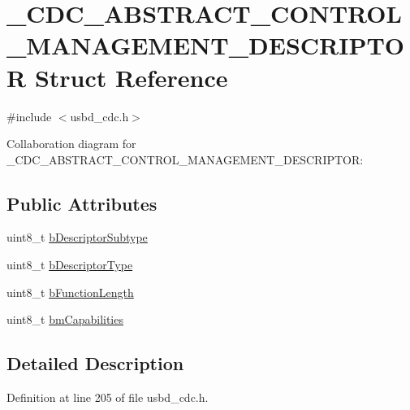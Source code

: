 \hypertarget{struct__CDC__ABSTRACT__CONTROL__MANAGEMENT__DESCRIPTOR}{}\section{\+\_\+\+C\+D\+C\+\_\+\+A\+B\+S\+T\+R\+A\+C\+T\+\_\+\+C\+O\+N\+T\+R\+O\+L\+\_\+\+M\+A\+N\+A\+G\+E\+M\+E\+N\+T\+\_\+\+D\+E\+S\+C\+R\+I\+P\+T\+OR Struct Reference}
\label{struct__CDC__ABSTRACT__CONTROL__MANAGEMENT__DESCRIPTOR}


{\ttfamily \#include $<$usbd\+\_\+cdc.\+h$>$}



Collaboration diagram for \+\_\+\+C\+D\+C\+\_\+\+A\+B\+S\+T\+R\+A\+C\+T\+\_\+\+C\+O\+N\+T\+R\+O\+L\+\_\+\+M\+A\+N\+A\+G\+E\+M\+E\+N\+T\+\_\+\+D\+E\+S\+C\+R\+I\+P\+T\+OR\+:
\subsection*{Public Attributes}
\begin{DoxyCompactItemize}
\item 
uint8\+\_\+t \hyperlink{struct__CDC__ABSTRACT__CONTROL__MANAGEMENT__DESCRIPTOR_a102b3c47bb589d906fa0ba2f383a8306}{b\+Descriptor\+Subtype}
\item 
uint8\+\_\+t \hyperlink{struct__CDC__ABSTRACT__CONTROL__MANAGEMENT__DESCRIPTOR_a5a7671be987b15ea0a360d4d0ba8981c}{b\+Descriptor\+Type}
\item 
uint8\+\_\+t \hyperlink{struct__CDC__ABSTRACT__CONTROL__MANAGEMENT__DESCRIPTOR_a97e809e9fd90d0da48f3fc083e6ffc01}{b\+Function\+Length}
\item 
uint8\+\_\+t \hyperlink{struct__CDC__ABSTRACT__CONTROL__MANAGEMENT__DESCRIPTOR_a42f90ae883dfbe07a590de4874972599}{bm\+Capabilities}
\end{DoxyCompactItemize}


\subsection{Detailed Description}


Definition at line 205 of file usbd\+\_\+cdc.\+h.



